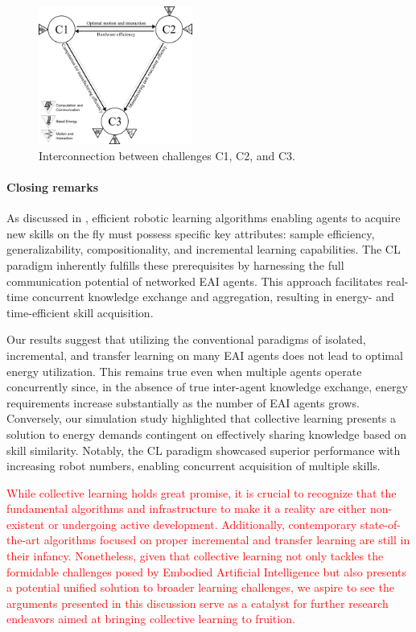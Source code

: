 \documentclass[12pt]{article}
\newcommand\myhl[1]{\textcolor{red}{#1}}
\begin{document}
\begin{figure}[!t]
	\centering
	\includegraphics[width=0.45\textwidth]{fig/grand_challenges_connections.png}
	\caption{Interconnection between challenges C1, C2, and C3.}
	\label{fig:challengesConnected}
\end{figure}

\paragraph*{Closing remarks}
As discussed in \cite{Kaelbling2020foundationefficientrobot}, efficient robotic learning algorithms enabling agents to acquire new skills on the fly must possess specific key attributes: sample efficiency, generalizability, compositionality, and incremental learning capabilities. The CL paradigm inherently fulfills these prerequisites by harnessing the full communication potential of networked EAI agents. This approach facilitates real-time concurrent knowledge exchange and aggregation, resulting in energy- and time-efficient skill acquisition.

Our results suggest that utilizing the conventional paradigms of isolated, incremental, and transfer learning on many EAI agents does not lead to optimal energy utilization. This remains true even when multiple agents operate concurrently since, in the absence of true inter-agent knowledge exchange, energy requirements increase substantially as the number of EAI agents grows. Conversely, our simulation study highlighted that collective learning presents a solution to energy demands contingent on effectively sharing knowledge based on skill similarity. Notably, the CL paradigm showcased superior performance with increasing robot numbers, enabling concurrent acquisition of multiple skills.

\myhl{While collective learning holds great promise, it is crucial to recognize that the fundamental algorithms and infrastructure to make it a reality are either non-existent or undergoing active development. Additionally, contemporary state-of-the-art algorithms focused on proper incremental and transfer learning are still in their infancy. Nonetheless, given that collective learning not only tackles the formidable challenges posed by Embodied Artificial Intelligence but also presents a potential unified solution to broader learning challenges, we aspire to see the arguments presented in this discussion serve as a catalyst for further research endeavors aimed at bringing collective learning to fruition.}
\end{document}
